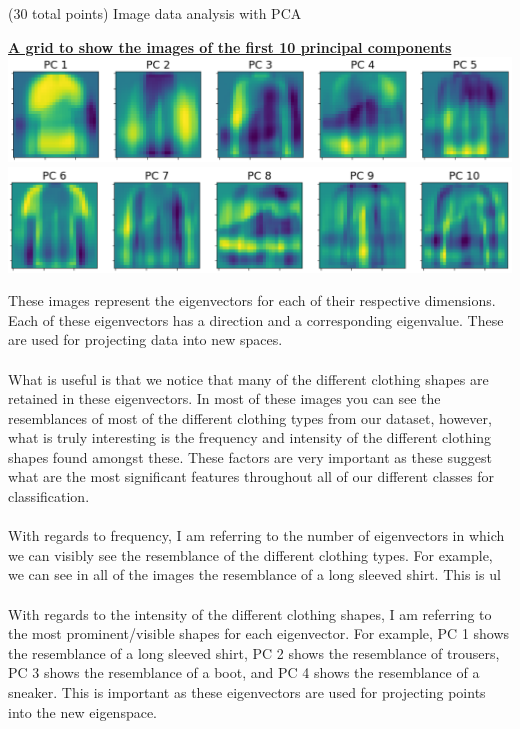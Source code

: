 \documentclass[12pt]{article}
\begin{document}
\begin{question}{(30 total points) Image data analysis with PCA}
\begin{subquestion}
      \begin{answerbox}{35em}
        \begin{center}
        \textbf{\underline{A grid to show the images of the first 10 principal components}}
        \vspace{0.3cm}\\
         \includegraphics[width=1\textwidth]{images/q151.png}
         \includegraphics[width=1\textwidth]{images/q152.png}
        \end{center}
        These images represent the eigenvectors for each of their respective dimensions. Each of these eigenvectors has a direction and a corresponding eigenvalue. These are used for projecting data into new spaces.\\
\\
        What is useful is that we notice that many of the different clothing shapes are retained in these eigenvectors. In most of these images you can see the resemblances of most of the different clothing types from our dataset, however, what is truly interesting is the frequency and intensity of the different clothing shapes found amongst these. These factors are very important as these suggest what are the most significant features throughout all of our different classes for classification.\\
\\
        With regards to frequency, I am referring to the number of eigenvectors in which we can visibly see the resemblance of the different clothing types. For example, we can see in all of the images the resemblance of a long sleeved shirt. This is ul\\
\\
        With regards to the intensity of the different clothing shapes, I am referring to the most prominent/visible shapes for each eigenvector. For example, PC 1 shows the resemblance of a long sleeved shirt, PC 2 shows the resemblance of trousers, PC 3 shows the resemblance of a boot, and PC 4 shows the resemblance of a sneaker. This is important as these eigenvectors are used for projecting points into the new eigenspace.
      \end{answerbox}
  



\end{subquestion}
\end{question}
\end{document}
